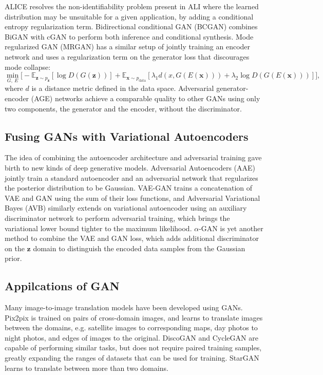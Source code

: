 ALICE \cite{li2017alice} resolves the non-identifiability problem present in ALI where the learned distribution may be unsuitable for a given application, by adding a conditional entropy regularization term.
Bidirectional conditional GAN (BCGAN) \cite{jaiswal2017bcgan} combines BiGAN with cGAN to perform both inference and conditional synthesis.
Mode regularized GAN (MRGAN) \cite{che2016mrgan} has a similar setup of jointly training an encoder network and uses a regularization term on the generator loss that discourages mode collapse:
\begin{equation}\label{eqn:mrgan}
\min_{G,~E} \Big[ - \mathbb{E}_{\bm{z} \sim p_{\bm{z}}} [ \log  D(G(\bm{z})) ]
+ \mathbb{E}_{\bm{x} \sim p_{\mathrm{data}}} [ \lambda_1 d(x, G(E(\bm{x}))) + \lambda_2 \log D(G(E(\bm{x}))) ] \Big],
\end{equation}
where $d$ is a distance metric defined in the data space.
Adversarial generator-encoder (AGE) networks \cite{ulyanov2017age} achieve a comparable quality to other GANs using only two components, the generator and the encoder, without the discriminator.


\subsection{Fusing GANs with Variational Autoencoders}

The idea of combining the autoencoder architecture and adversarial training gave birth to new kinds of deep generative models.
Adversarial Autoencoders (AAE) \cite{makhzani2015aae} jointly train a standard autoencoder and an adversarial network that regularizes the posterior distribution to be Gaussian.
VAE-GAN \cite{larsen2015vaegan} trains a concatenation of VAE and GAN using the sum of their loss functions, and Adversarial Variational Bayes (AVB) \cite{mescheder2017adversarial} similarly extends on variational autoencoder using an auxiliary discriminator network to perform adversarial training, which brings the variational lower bound tighter to the maximum likelihood.
$\alpha$-GAN \cite{rosca2017alphagan} is yet another method to combine the VAE and GAN loss, which adds additional discriminator on the $\bm{z}$ domain to distinguish the encoded data samples from the Gaussian prior.


\subsection{Appilcations of GAN}

Many image-to-image translation models have been developed using GANs. Pix2pix \cite{isola2017pix2pix} is trained on pairs of cross-domain images, and learns to translate images between the domains, e.g. satellite images to corresponding maps, day photos to night photos, and edges of images to the original.
DiscoGAN and CycleGAN \cite{kim2017discogan, zhu2017cyclegan} are capable of performing similar tasks, but does not require paired training samples, greatly expanding the ranges of datasets that can be used for training.
StarGAN \cite{choi2017stargan} learns to translate between more than two domains.

